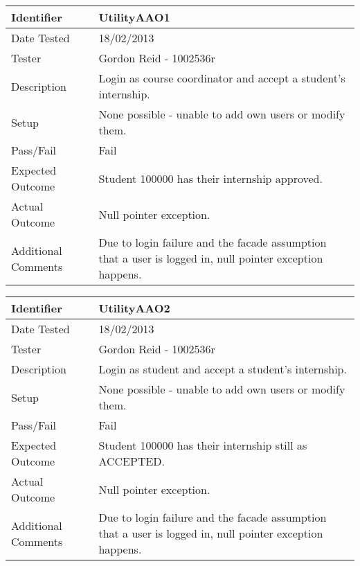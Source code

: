 \begin{tabularx}{\textwidth}{|T|L|}
\hline
Identifier & UtilityAAO1\\
\hline
Date Tested & 18/02/2013\\
\hline
Tester & Gordon Reid - 1002536r\\
\hline
Description & Login as course coordinator and accept a student's internship.\\
\hline
Setup & None possible - unable to add own users or modify them.\\
\hline
Pass/Fail & Fail\\
\hline
Expected Outcome & Student 100000 has their internship approved.\\
\hline
Actual Outcome & Null pointer exception.\\
\hline
Additional Comments & Due to login failure and the facade assumption that a
user is logged in, null pointer exception happens.\\
\hline
\end{tabularx}

\vspace{2em}

\begin{tabularx}{\textwidth}{|T|L|}
\hline
Identifier & UtilityAAO2\\
\hline
Date Tested & 18/02/2013\\
\hline
Tester & Gordon Reid - 1002536r\\
\hline
Description & Login as student and accept a student's internship.\\
\hline
Setup & None possible - unable to add own users or modify them.\\
\hline
Pass/Fail & Fail\\
\hline
Expected Outcome & Student 100000 has their internship still as ACCEPTED.\\
\hline
Actual Outcome & Null pointer exception.\\
\hline
Additional Comments & Due to login failure and the facade assumption that a
user is logged in, null pointer exception happens.\\
\hline
\end{tabularx}

\vspace{2em}

